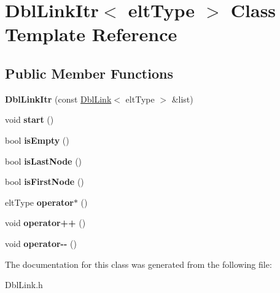 \hypertarget{classDblLinkItr}{\section{Dbl\-Link\-Itr$<$ elt\-Type $>$ Class Template Reference}
\label{classDblLinkItr}
}
\subsection*{Public Member Functions}
\begin{DoxyCompactItemize}
\item 
\hypertarget{classDblLinkItr_a029e88245826cd3f4940e8c2ccdf1508}{{\bfseries Dbl\-Link\-Itr} (const \hyperlink{classDblLink}{Dbl\-Link}$<$ elt\-Type $>$ \&list)}\label{classDblLinkItr_a029e88245826cd3f4940e8c2ccdf1508}

\item 
\hypertarget{classDblLinkItr_a1f2303149b9a0ecc0cc94fc3669d42e6}{void {\bfseries start} ()}\label{classDblLinkItr_a1f2303149b9a0ecc0cc94fc3669d42e6}

\item 
\hypertarget{classDblLinkItr_abd8531686d0efb34dfe334070755bedd}{bool {\bfseries is\-Empty} ()}\label{classDblLinkItr_abd8531686d0efb34dfe334070755bedd}

\item 
\hypertarget{classDblLinkItr_a481fe000f5c0b9e9a90c8ec947ac2366}{bool {\bfseries is\-Last\-Node} ()}\label{classDblLinkItr_a481fe000f5c0b9e9a90c8ec947ac2366}

\item 
\hypertarget{classDblLinkItr_abd2248f781624a381dcc407af0081314}{bool {\bfseries is\-First\-Node} ()}\label{classDblLinkItr_abd2248f781624a381dcc407af0081314}

\item 
\hypertarget{classDblLinkItr_ac3e8e420c63d144a562da5dbb8da9ce0}{elt\-Type {\bfseries operator$\ast$} ()}\label{classDblLinkItr_ac3e8e420c63d144a562da5dbb8da9ce0}

\item 
\hypertarget{classDblLinkItr_a6880f6792f580bcbaa677c509bcfef8a}{void {\bfseries operator++} ()}\label{classDblLinkItr_a6880f6792f580bcbaa677c509bcfef8a}

\item 
\hypertarget{classDblLinkItr_aa3dec9a784bfee4907bc1a7a94bbf1dc}{void {\bfseries operator-\/-\/} ()}\label{classDblLinkItr_aa3dec9a784bfee4907bc1a7a94bbf1dc}

\end{DoxyCompactItemize}


The documentation for this class was generated from the following file\-:\begin{DoxyCompactItemize}
\item 
Dbl\-Link.\-h\end{DoxyCompactItemize}

